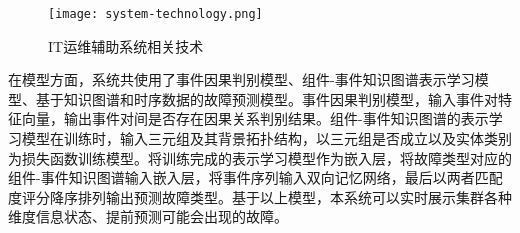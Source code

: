 \begin{figure}[htbp]
    \centering
    \texttt{[image: system-technology.png]}
    \caption{IT运维辅助系统相关技术\label{system-technology}}
\end{figure}

在模型方面，系统共使用了事件因果判别模型、组件-事件知识图谱表示学习模型、基于知识图谱和时序数据的故障预测模型。事件因果判别模型，输入事件对特征向量，输出事件对间是否存在因果关系判别结果。组件-事件知识图谱的表示学习模型在训练时，输入三元组及其背景拓扑结构，以三元组是否成立以及实体类别为损失函数训练模型。将训练完成的表示学习模型作为嵌入层，将故障类型对应的组件-事件知识图谱输入嵌入层，将事件序列输入双向记忆网络，最后以两者匹配度评分降序排列输出预测故障类型。基于以上模型，本系统可以实时展示集群各种维度信息状态、提前预测可能会出现的故障。

